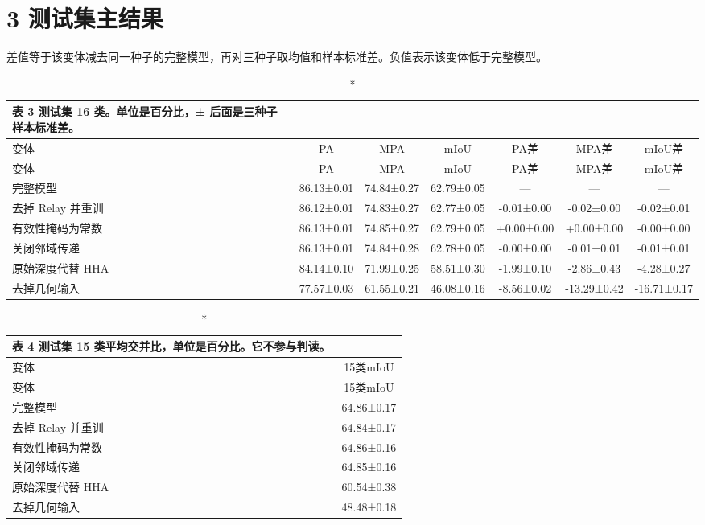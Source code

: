 \documentclass[11pt]{article}
\begin{document}
\section*{3  测试集主结果}
差值等于该变体减去同一种子的完整模型，再对三种子取均值和样本标准差。负值表示该变体低于完整模型。

{\footnotesize\setlength{\tabcolsep}{3pt}
\begin{longtable}{lcccccc}
\caption*{表 3  测试集 16 类。单位是百分比，± 后面是三种子样本标准差。}\\
\toprule
变体 & PA & MPA & mIoU & PA差 & MPA差 & mIoU差\\
\midrule
\endfirsthead
\toprule
变体 & PA & MPA & mIoU & PA差 & MPA差 & mIoU差\\
\midrule
\endhead
完整模型 & 86.13±0.01 & 74.84±0.27 & 62.79±0.05 & — & — & —\\
去掉 Relay 并重训 & 86.12±0.01 & 74.83±0.27 & 62.77±0.05 & -0.01±0.00 & -0.02±0.00 & -0.02±0.01\\
有效性掩码为常数 & 86.13±0.01 & 74.85±0.27 & 62.79±0.05 & +0.00±0.00 & +0.00±0.00 & -0.00±0.00\\
关闭邻域传递 & 86.13±0.01 & 74.84±0.28 & 62.78±0.05 & -0.00±0.00 & -0.01±0.01 & -0.01±0.01\\
原始深度代替 HHA & 84.14±0.10 & 71.99±0.25 & 58.51±0.30 & -1.99±0.10 & -2.86±0.43 & -4.28±0.27\\
去掉几何输入 & 77.57±0.03 & 61.55±0.21 & 46.08±0.16 & -8.56±0.02 & -13.29±0.42 & -16.71±0.17\\
\bottomrule
\end{longtable}}
{\footnotesize\setlength{\tabcolsep}{3pt}
\begin{longtable}{lc}
\caption*{表 4  测试集 15 类平均交并比，单位是百分比。它不参与判读。}\\
\toprule
变体 & 15类mIoU\\
\midrule
\endfirsthead
\toprule
变体 & 15类mIoU\\
\midrule
\endhead
完整模型 & 64.86±0.17\\
去掉 Relay 并重训 & 64.84±0.17\\
有效性掩码为常数 & 64.86±0.16\\
关闭邻域传递 & 64.85±0.16\\
原始深度代替 HHA & 60.54±0.38\\
去掉几何输入 & 48.48±0.18\\
\bottomrule
\end{longtable}}
\end{document}
